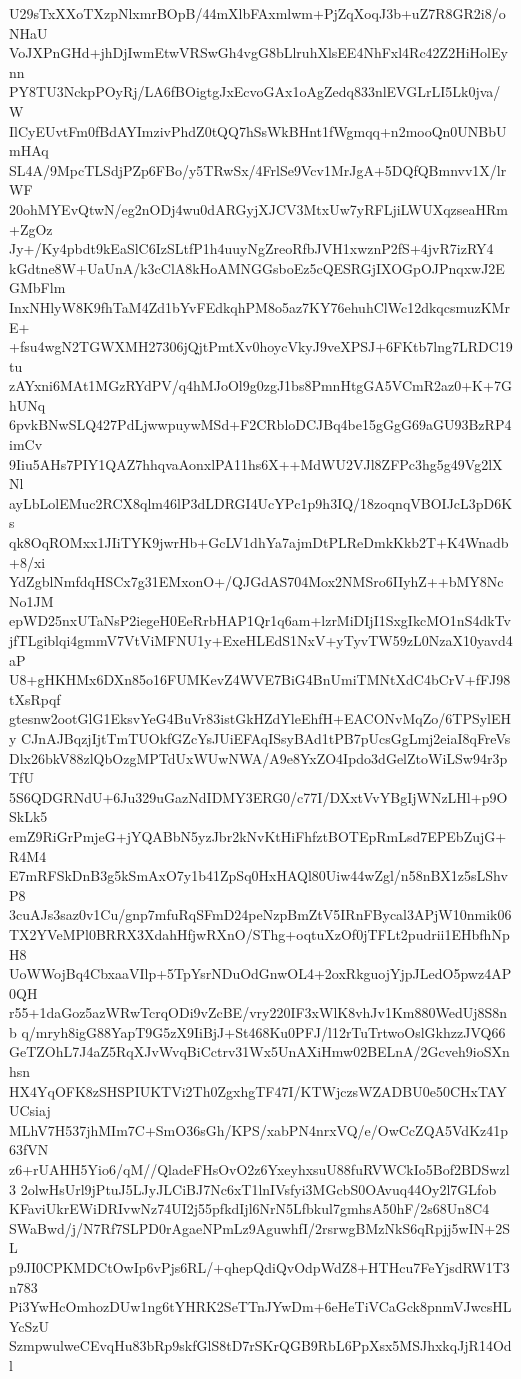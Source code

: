 U29sTxXXoTXzpNlxmrBOpB/44mXlbFAxmlwm+PjZqXoqJ3b+uZ7R8GR2i8/oNHaU
VoJXPnGHd+jhDjIwmEtwVRSwGh4vgG8bLlruhXlsEE4NhFxl4Rc42Z2HiHolEynn
PY8TU3NckpPOyRj/LA6fBOigtgJxEcvoGAx1oAgZedq833nlEVGLrLI5Lk0jva/W
IlCyEUvtFm0fBdAYImzivPhdZ0tQQ7hSsWkBHnt1fWgmqq+n2mooQn0UNBbUmHAq
SL4A/9MpcTLSdjPZp6FBo/y5TRwSx/4FrlSe9Vcv1MrJgA+5DQfQBmnvv1X/lrWF
20ohMYEvQtwN/eg2nODj4wu0dARGyjXJCV3MtxUw7yRFLjiLWUXqzseaHRm+ZgOz
Jy+/Ky4pbdt9kEaSlC6IzSLtfP1h4uuyNgZreoRfbJVH1xwznP2fS+4jvR7izRY4
kGdtne8W+UaUnA/k3cClA8kHoAMNGGsboEz5cQESRGjIXOGpOJPnqxwJ2EGMbFlm
InxNHlyW8K9fhTaM4Zd1bYvFEdkqhPM8o5az7KY76ehuhClWc12dkqcsmuzKMrE+
+fsu4wgN2TGWXMH27306jQjtPmtXv0hoycVkyJ9veXPSJ+6FKtb7lng7LRDC19tu
zAYxni6MAt1MGzRYdPV/q4hMJoOl9g0zgJ1bs8PmnHtgGA5VCmR2az0+K+7GhUNq
6pvkBNwSLQ427PdLjwwpuywMSd+F2CRbloDCJBq4be15gGgG69aGU93BzRP4imCv
9Iiu5AHs7PIY1QAZ7hhqvaAonxlPA11hs6X++MdWU2VJl8ZFPc3hg5g49Vg2lXNl
ayLbLolEMuc2RCX8qlm46lP3dLDRGI4UcYPc1p9h3IQ/18zoqnqVBOIJcL3pD6Ks
qk8OqROMxx1JIiTYK9jwrHb+GcLV1dhYa7ajmDtPLReDmkKkb2T+K4Wnadb+8/xi
YdZgblNmfdqHSCx7g31EMxonO+/QJGdAS704Mox2NMSro6IIyhZ++bMY8NcNo1JM
epWD25nxUTaNsP2iegeH0EeRrbHAP1Qr1q6am+lzrMiDIjI1SxgIkcMO1nS4dkTv
jfTLgiblqi4gmmV7VtViMFNU1y+ExeHLEdS1NxV+yTyvTW59zL0NzaX10yavd4aP
U8+gHKHMx6DXn85o16FUMKevZ4WVE7BiG4BnUmiTMNtXdC4bCrV+fFJ98tXsRpqf
gtesnw2ootGlG1EksvYeG4BuVr83istGkHZdYleEhfH+EACONvMqZo/6TPSylEHy
CJnAJBqzjIjtTmTUOkfGZcYsJUiEFAqISsyBAd1tPB7pUcsGgLmj2eiaI8qFreVs
Dlx26bkV88zlQbOzgMPTdUxWUwNWA/A9e8YxZO4Ipdo3dGelZtoWiLSw94r3pTfU
5S6QDGRNdU+6Ju329uGazNdIDMY3ERG0/c77I/DXxtVvYBgIjWNzLHl+p9OSkLk5
emZ9RiGrPmjeG+jYQABbN5yzJbr2kNvKtHiFhfztBOTEpRmLsd7EPEbZujG+R4M4
E7mRFSkDnB3g5kSmAxO7y1b41ZpSq0HxHAQl80Uiw44wZgl/n58nBX1z5sLShvP8
3cuAJs3saz0v1Cu/gnp7mfuRqSFmD24peNzpBmZtV5IRnFBycal3APjW10nmik06
TX2YVeMPl0BRRX3XdahHfjwRXnO/SThg+oqtuXzOf0jTFLt2pudrii1EHbfhNpH8
UoWWojBq4CbxaaVIlp+5TpYsrNDuOdGnwOL4+2oxRkguojYjpJLedO5pwz4AP0QH
r55+1daGoz5azWRwTcrqODi9vZcBE/vry220IF3xWlK8vhJv1Km880WedUj8S8nb
q/mryh8igG88YapT9G5zX9IiBjJ+St468Ku0PFJ/l12rTuTrtwoOslGkhzzJVQ66
GeTZOhL7J4aZ5RqXJvWvqBiCctrv31Wx5UnAXiHmw02BELnA/2Gcveh9ioSXnhsn
HX4YqOFK8zSHSPIUKTVi2Th0ZgxhgTF47I/KTWjczsWZADBU0e50CHxTAYUCsiaj
MLhV7H537jhMIm7C+SmO36sGh/KPS/xabPN4nrxVQ/e/OwCcZQA5VdKz41p63fVN
z6+rUAHH5Yio6/qM//QladeFHsOvO2z6YxeyhxsuU88fuRVWCkIo5Bof2BDSwzl3
2olwHsUrl9jPtuJ5LJyJLCiBJ7Nc6xT1lnIVsfyi3MGcbS0OAvuq44Oy2l7GLfob
KFaviUkrEWiDRIvwNz74UI2j55pfkdIjl6NrN5Lfbkul7gmhsA50hF/2s68Un8C4
SWaBwd/j/N7Rf7SLPD0rAgaeNPmLz9AguwhfI/2rsrwgBMzNkS6qRpjj5wIN+2SL
p9JI0CPKMDCtOwIp6vPjs6RL/+qhepQdiQvOdpWdZ8+HTHcu7FeYjsdRW1T3n783
Pi3YwHcOmhozDUw1ng6tYHRK2SeTTnJYwDm+6eHeTiVCaGck8pnmVJwcsHLYcSzU
SzmpwulweCEvqHu83bRp9skfGlS8tD7rSKrQGB9RbL6PpXsx5MSJhxkqJjR14Odl
